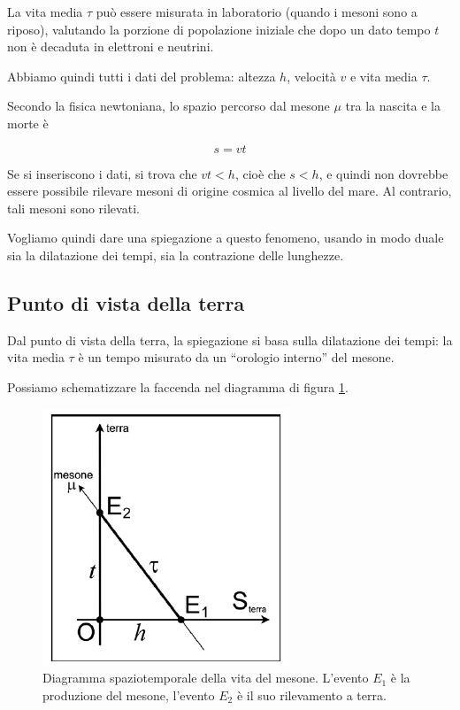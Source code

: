 La vita media $\tau$ può essere misurata in laboratorio (quando i mesoni
sono a riposo), valutando la porzione di popolazione iniziale che dopo un
dato tempo $t$ non è decaduta in elettroni e neutrini. 

Abbiamo quindi tutti i dati del problema: altezza $h$, velocità $v$ e vita media $\tau$.

Secondo la fisica newtoniana, lo spazio percorso dal mesone $\mu$ tra la
nascita e la morte è

\begin{equation}
s = vt 
\end{equation}

Se si inseriscono i dati, si trova che $vt < h$, cioè che $s < h$, e quindi non
dovrebbe essere possibile rilevare mesoni di origine cosmica al livello del mare.
Al contrario, tali mesoni sono rilevati.

Vogliamo quindi dare una spiegazione a questo fenomeno, usando in modo duale sia 
la dilatazione dei tempi, sia la contrazione delle lunghezze.

\subsection{Punto di vista della terra}
Dal punto di vista della terra, la spiegazione si basa sulla dilatazione dei
tempi: la vita media $\tau$ è un tempo misurato da un ``orologio interno'' del mesone.

Possiamo schematizzare la faccenda nel diagramma di figura \ref{diagramma_mu}.

\begin{figure}[htbp]
   \centering
   \includegraphics[scale=1]{immagini/conferme_relspec/diagramma_mu}
   \caption{\label{diagramma_mu}Diagramma spaziotemporale della vita del mesone. L'evento
$E_1$ è la produzione del mesone, l'evento $E_2$ è il suo rilevamento a terra.}
\end{figure}

